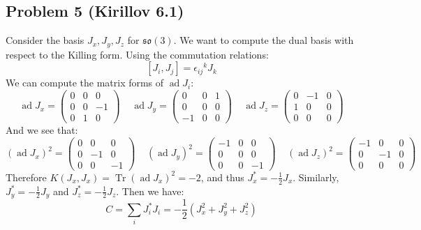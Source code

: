 \documentclass[12 pt]{article}
\newcommand{\fr}{\mathfrak}
\DeclareMathOperator{\Tr}{Tr}
\DeclareMathOperator {\ad} {ad}
\begin{document}
\subsection*{Problem 5 (Kirillov 6.1)}
Consider the basis $J_x, J_y, J_z$ for $\fr{so}(3)$. We want to compute the dual basis with respect to the Killing form. Using the commutation relations:
\[        [J_i, J_j] = {\epsilon_{ij}}^k J_k     \]
We can compute the matrix forms of $\ad J_i$:
\[       \ad J_x =  \left(\begin{array}{ccc} 0 & 0 & 0 \\ 0 & 0&-1 \\ 0&1&0\end{array}\right)  \;\;\;\; \ad J_y =  \left(\begin{array}{ccc} 0 & 0 & 1 \\ 0 & 0&0 \\ -1&0&0\end{array}\right) \;\;\;\; \ad J_z =  \left(\begin{array}{ccc} 0 & -1 & 0 \\ 1 & 0&0 \\ 0&0&0\end{array}\right)      \]
And we see that:
\[     (\ad J_x)^2 =  \left(\begin{array}{ccc} 0 & 0 & 0 \\ 0 & -1&0 \\ 0&0&-1\end{array}\right)\;\;\;\; (\ad J_y)^2 =  \left(\begin{array}{ccc} -1 & 0 & 0 \\ 0 & 0&0 \\ 0&0&-1\end{array}\right) \;\;\;\; (\ad J_z)^2 =  \left(\begin{array}{ccc} -1 & 0 & 0 \\ 0 & -1&0 \\ 0&0&0\end{array}\right)      \]
Therefore $K(J_x, J_x) = \Tr(\ad J_x)^2 = -2$, and thus $J_x^* = - \frac{1}{2} J_x$. Similarly, $J_y^* = - \frac{1}{2} J_y$ and $J_z^* = - \frac{1}{2} J_z$. Then we have:
\[         C = \sum_i J^*_i J_i = - \frac{1}{2} (J_x^2 + J_y^2 + J_z^2)      \]
\end{document}
